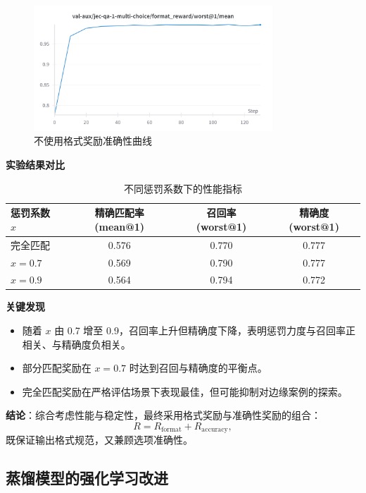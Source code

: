 \documentclass{pkuthesis}
\begin{document}
\begin{figure}[h]
  \centering
  \includegraphics[width=0.8\textwidth]{figures/format.png}
  \caption{不使用格式奖励准确性曲线}
  \label{fig:format}
\end{figure}

\noindent\textbf{实验结果对比}

\begin{table}[h]
  \centering
  \caption{不同惩罚系数下的性能指标}
  \begin{tabular}{l|c|c|c}
    \hline
    惩罚系数 $x$ & 精确匹配率 (mean@1) & 召回率 (worst@1) & 精确度 (worst@1) \\
    \hline
    完全匹配 & 0.576 & 0.770 & 0.777 \\
    $x=0.7$  & 0.569 & 0.790 & 0.777 \\
    $x=0.9$  & 0.564 & 0.794 & 0.772 \\
    \hline
  \end{tabular}
\end{table}

\noindent\textbf{关键发现}
\begin{itemize}
  \item 随着 $x$ 由 0.7 增至 0.9，召回率上升但精确度下降，表明惩罚力度与召回率正相关、与精确度负相关。
  \item 部分匹配奖励在 $x=0.7$ 时达到召回与精确度的平衡点。
  \item 完全匹配奖励在严格评估场景下表现最佳，但可能抑制对边缘案例的探索。
\end{itemize}

\noindent\textbf{结论}：综合考虑性能与稳定性，最终采用格式奖励与准确性奖励的组合：
\[
R = R_{\mathrm{format}} + R_{\mathrm{accuracy}},
\]
既保证输出格式规范，又兼顾选项准确性。

\subsection{蒸馏模型的强化学习改进}
\end{document}
